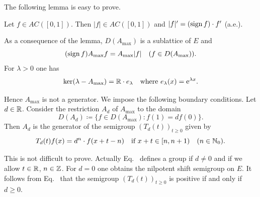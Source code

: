 The following lemma is easy to prove.
\begin{lemma}\label{lem:c2-3.14}
Let $f \in AC([0,1])$. 
Then $|f| \in AC([0,1])$ and $|f|' = (\operatorname{sign}  f) \cdot f'$ (a.e.).
\end{lemma}
As a consequence of the lemma, $D(A_{\max})$ is a sublattice of\/ $E$ and
\begin{equation}\label{eq:c2-3.7}
(\operatorname{sign}  f)A_{\max}f = A_{\max}|f| \quad (f \in D(A_{\max})).
\end{equation}
For $\lambda > 0$ one has
\begin{equation}\label{eq:c2-3.8}
\text{ker}(\lambda - A_{\max}) = \mathbb{R} \cdot e_{\lambda} \quad \text{where }  e_{\lambda}(x) = \mathrm{e}^{\lambda x}.
\end{equation}

Hence $A_{\max}$ is not a generator. 
We impose the following boundary conditions.
Let $d \in \mathbb{R}$. 
Consider the restriction $A_{d}$ of\/ $A_{\max}$ to the domain
\begin{equation*}
D(A_{d}) \coloneq \{f \in D(A_{\max}) \colon f(1) = d f(0)\}.
\end{equation*}
Then $A_{d}$ is the generator of the semigroup $(T_{d}(t))_{t \geq 0}$ given by
\begin{equation}\label{eq:c2-3.9}
T_{d}(t)f(x) = d^{n} \cdot f(x+t-n) \quad \text{if } x+t \in [n, n+1) \quad (n \in \mathbb{N}_{0}).
\end{equation}

This is not difficult to prove. 
Actually Eq.~ defines a group if\/ $d \neq 0$ and if we allow $t \in \mathbb{R}$, $n \in \mathbb{Z} $. For $d = 0$ one obtains the nilpotent shift semigroup on $E$.
It follows from Eq.~ that the semigroup $(T_{d}(t))_{t \geq 0}$ is positive if and only if\/ $d \geq 0$.

